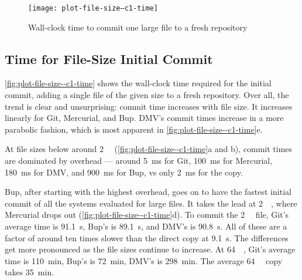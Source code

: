 %


\begin{figure}[p]
    \begin{leftfullpage}
        \caption{Wall-clock time to commit one large file to a fresh repository}
        \label{fig:plot-file-size--c1-time}
        \centering

        \explainlogsubfig

        \texttt{[image: plot-file-size--c1-time]}
    \end{leftfullpage}
\end{figure}

\cleardoublepage

\subsection{Time for File-Size Initial Commit}
\label{results-file-size--c1-time}

\autoref{fig:plot-file-size--c1-time} shows the wall-clock time required for the
initial \gls{commit}, adding a single file of the given size to a fresh
\gls{repository}. Over all, the trend is clear and unsurprising: \gls{commit}
time increases with file size. It increases linearly for Git, Mercurial, and
Bup. DMV's commit times increase in a more parabolic fashion, which is most
apparent in \autoref{fig:plot-file-size--c1-time}e.

At file sizes below around \SI{2}{\mebi\byte}
(\autoref{fig:plot-file-size--c1-time}a and b), \gls{commit} times are dominated
by overhead --- around \SI{5}{\ms} for Git, \SI{100}{\ms} for Mercurial,
\SI{180}{\ms} for \gls{DMV}, and \SI{900}{\ms} for Bup, vs only \SI{2}{\ms} for
the copy.

Bup, after starting with the highest overhead, goes on to have the fastest
initial \gls{commit} of all the systems evaluated for large files. It takes the
lead at \SI{2}{\gibi\byte}, where Mercurial drops out
(\autoref{fig:plot-file-size--c1-time}d). To \gls{commit} the \SI{2}{\gibi\byte}
file, Git's average time is \SI{91.1}{\s}, Bup's is \SI{89.1}{\s}, and
\gls{DMV}'s is \SI{90.8}{\s}. All of these are a factor of around ten times
slower than the direct copy at \SI{9.1}{\s}. The differences get more pronounced
as the file sizes continue to increase. At \SI{64}{\gibi\byte}, Git's average
time is \SI{110}{\minute}, Bup's is \SI{72}{\minute}, \gls{DMV}'s is
\SI{298}{\minute}. The average \SI{64}{\gibi\byte} copy takes \SI{35}{\minute}.


